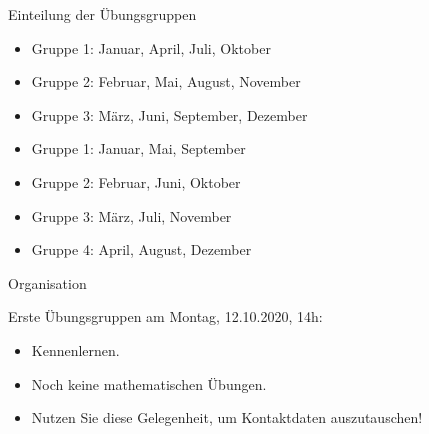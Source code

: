 \documentclass[german]{beamer}
\begin{document}
\begin{frame}{Einteilung der \"Ubungsgruppen}

\begin{example}[3 \"Ubungsgruppen]
\begin{itemize}
\item Gruppe 1: Januar, April, Juli, Oktober
\item Gruppe 2: Februar, Mai, August, November
\item Gruppe 3: M\"arz, Juni, September, Dezember
\end{itemize}
\end{example}

\begin{example}[4 \"Ubungsgruppen]
\begin{itemize}
\item Gruppe 1: Januar, Mai, September
\item Gruppe 2: Februar, Juni, Oktober
\item Gruppe 3: M\"arz, Juli, November
\item Gruppe 4: April, August, Dezember
\end{itemize}
\end{example}

\end{frame}

\begin{frame}{Organisation}

Erste \"Ubungsgruppen am Montag, 12.10.2020, 14h:

\begin{itemize}
\item Kennenlernen.

\item Noch keine mathematischen \"Ubungen.

\item Nutzen Sie diese Gelegenheit, um Kontaktdaten auszutauschen!

\end{itemize}

\end{frame}
\end{document}

